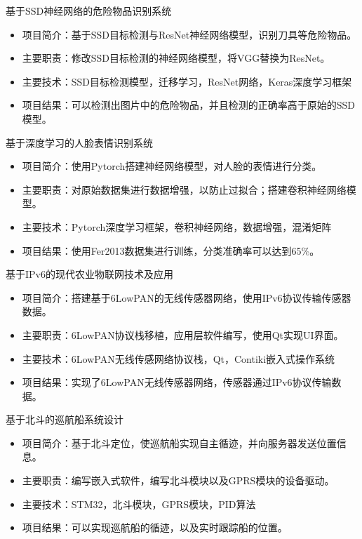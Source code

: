 \documentclass[11pt, a4paper]{moderncv}
\begin{document}
	{基于SSD神经网络的危险物品识别系统}
	{}{}{}{
		\begin{itemize}
			\item 项目简介：基于SSD目标检测与ResNet神经网络模型，识别刀具等危险物品。
			\item 主要职责：修改SSD目标检测的神经网络模型，将VGG替换为ResNet。
			\item 主要技术：SSD目标检测模型，迁移学习，ResNet网络，Keras深度学习框架
			\item 项目结果：可以检测出图片中的危险物品，并且检测的正确率高于原始的SSD模型。
	\end{itemize}}{}

	{基于深度学习的人脸表情识别系统}
	{}{}{}{
		\begin{itemize}
			\item 项目简介：使用Pytorch搭建神经网络模型，对人脸的表情进行分类。
			\item 主要职责：对原始数据集进行数据增强，以防止过拟合；搭建卷积神经网络模型。
			\item 主要技术：Pytorch深度学习框架，卷积神经网络，数据增强，混淆矩阵
			\item 项目结果：使用Fer2013数据集进行训练，分类准确率可以达到65\%。
	\end{itemize}}{}

	{基于IPv6的现代农业物联网技术及应用}
	{}{}{}{
		\begin{itemize}
			\item 项目简介：搭建基于6LowPAN的无线传感器网络，使用IPv6协议传输传感器数据。
			\item 主要职责：6LowPAN协议栈移植，应用层软件编写，使用Qt实现UI界面。
			\item 主要技术：6LowPAN无线传感网络协议栈，Qt，Contiki嵌入式操作系统
			\item 项目结果：实现了6LowPAN无线传感器网络，传感器通过IPv6协议传输数据。
	\end{itemize}}{}

	{基于北斗的巡航船系统设计}
	{}{}{}{
		\begin{itemize}
			\item 项目简介：基于北斗定位，使巡航船实现自主循迹，并向服务器发送位置信息。
			\item 主要职责：编写嵌入式软件，编写北斗模块以及GPRS模块的设备驱动。
			\item 主要技术：STM32，北斗模块，GPRS模块，PID算法
			\item 项目结果：可以实现巡航船的循迹，以及实时跟踪船的位置。
	\end{itemize}}{}
\end{document}

